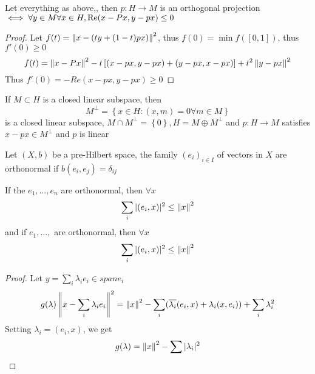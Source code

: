 \documentclass[../main.tex]{subfiles}
\begin{document}
\begin{lemma}
Let everything as above,, then $p:H\to M$ is an orthogonal projection $\iff \forall y \in M \forall x \in H, \operatorname{Re}( x-Px,y-px) \leq 0$ 
\end{lemma}
\begin{proof}
Let $f( t) = \left\lVert x- ( ty + ( 1-t) px) \right\rVert^{2} $, thus $f( 0) = \min f( [ 0,1] ) $, thus $f'( 0) \geq 0$ 
\[ 
f( t) = \left\lVert x-Px\right\rVert^{2} - t \left[ ( x-px,y-px) + ( y- px,x-px) \right] + t^{2} \left\lVert y- px\right\rVert^{2}
\]
Thus $f'( 0) = - Re( x-px,y -px) \geq 0$ 
\end{proof}
\begin{crly}
If $M \subset H$ is a closed linear subspace, then 
\[ 
M^{\perp}= \left\{ x\in H: ( x,m) =0 \forall m \in M \right\} 
\]
is a closed linear subspace, $M \cap M^{\perp}= \left\{ 0 \right\} , H = M \oplus M^{\perp}$ and $p:H \to M$ satisfies $x-px \in M^{\perp}$ and $p$ is linear
\end{crly}
\begin{defn}
	Let $( X,b) $ be a pre-Hilbert space, the family $( e_i)_{i \in I} $ of vectors in $X$ are orthonormal if $b( e_i,e_j) = \delta_{ij } $ 
\end{defn}
\begin{lemma}
If the $e_1, \ldots, e_n$ are orthonormal, then $\forall  x $ 
\[ 
\sum_i | ( e_i,x) |^{2} \leq  \left\lVert x\right\rVert^{2}
\]
and if $e_1,\ldots, $ are orthonormal, then $\forall x $ 
\[ 
\sum_i |( e_i,x) |^{2} \leq  \left\lVert x\right\rVert ^{2}
\]

\end{lemma}
\begin{proof}
Let $y = \sum_i \lambda_i e_i \in span e_i$ 
\[ 
g( \lambda) \left\lVert x- \sum_i \lambda_i e_i\right\rVert^{2} = \left\lVert x\right\rVert^{2} - \sum_i  ( \overline{\lambda_i}( e_i,x)+ \lambda_i ( x,e_i) ) + \sum_i \lambda_i ^{2}
\]
Setting $\lambda_i = ( e_i,x) $, we get 
\[ 
g( \lambda) = \left\lVert x\right\rVert ^{2} - \sum |\lambda_i|^{2}
\]

\end{proof}






	
\end{document}
